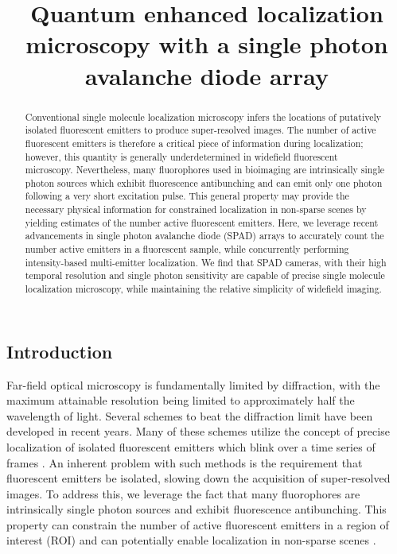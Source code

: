 \documentclass[a4paper, twocolumn, superscriptaddress,prl]{revtex4}  %
\begin{document}
\title{Quantum enhanced localization microscopy with a single photon avalanche diode array}
\author{}

\begin{abstract}
Conventional single molecule localization microscopy infers the locations of putatively isolated fluorescent emitters to produce super-resolved images. The number of active fluorescent emitters is therefore a critical piece of information during localization; however, this quantity is generally underdetermined in widefield fluorescent microscopy. Nevertheless, many fluorophores used in bioimaging are intrinsically single photon sources which exhibit fluorescence antibunching and can emit only one photon following a very short excitation pulse. This general property may provide the necessary physical information for constrained localization in non-sparse scenes by yielding estimates of the number active fluorescent emitters. Here, we leverage recent advancements in single photon avalanche diode (SPAD) arrays to accurately count the number active emitters in a fluorescent sample, while concurrently performing intensity-based multi-emitter localization. We find that SPAD cameras, with their high temporal resolution and single photon sensitivity are capable of precise single molecule localization microscopy, while maintaining the relative simplicity of widefield imaging. 
\end{abstract}

\maketitle 

\subsection{Introduction}

Far-field optical microscopy is fundamentally limited by diffraction, with the maximum attainable resolution being limited to approximately half the wavelength of light. Several schemes to beat the diffraction limit have been developed in recent years. Many of these schemes utilize the concept of precise localization of isolated fluorescent emitters which blink over a time series of frames \citep{Rust2006,Betzig2006}. An inherent problem with such methods is the requirement that fluorescent emitters be isolated, slowing down the acquisition of super-resolved images. To address this, we leverage the fact that many fluorophores are intrinsically single photon sources and exhibit fluorescence antibunching. This property can constrain the number of active fluorescent emitters in a region of interest (ROI) and can potentially enable localization in non-sparse scenes \citep{Ta2010,Israel2017}. 
\end{document}
